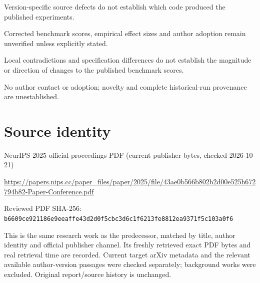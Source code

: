 \documentclass[11pt]{article}
\begin{document}
Version-specific source defects do not establish which code produced the published experiments.\par

Corrected benchmark scores, empirical effect sizes and author adoption remain unverified unless explicitly stated.\par

Local contradictions and specification differences do not establish the magnitude or direction of changes to the published benchmark scores.\par

No author contact or adoption; novelty and complete historical-run provenance are unestablished.\par

\section*{Source identity}

NeurIPS 2025 official proceedings PDF (current publisher bytes, checked 2026-10-21)

\url{https://papers.nips.cc/paper_files/paper/2025/file/43ae0b566b802b2d00e525b672794b82-Paper-Conference.pdf}

Reviewed PDF SHA-256: \nolinkurl{b6609ce921186e9eeaffe43d2d0f5cbc3d6c1f6213fe8812ea9371f5c103a0f6}

This is the same research work as the predecessor, matched by title, author identity and official publisher channel. Its freshly retrieved exact PDF bytes and real retrieval time are recorded. Current target arXiv metadata and the relevant available author-version passages were checked separately; background works were excluded. Original report/source history is unchanged.
\end{document}
